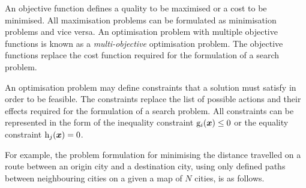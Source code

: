 An objective function defines a quality to be maximised or a cost to be minimised.
All maximisation problems can be formulated as minimisation problems and vice versa.
An optimisation problem with multiple objective functions is known as a \emph{multi-objective} optimisation problem.
The objective functions replace the cost function required for the formulation of a search problem.

An optimisation problem may define constraints that a solution must satisfy in order to be feasible.
The constraints replace the list of possible actions and their effects required for the formulation of a search problem.
All constraints can be represented in the form of the inequality constraint \( \function[_{i}]{g}{\boldsymbol{x}} \leq 0 \) or the equality constraint \( \function[_{j}]{h}{\boldsymbol{x}} = 0 \).

For example, the problem formulation for minimising the distance travelled on a route between an origin city and a destination city, using only defined paths between neighbouring cities on a given a map of \( N \) cities, is as follows.

